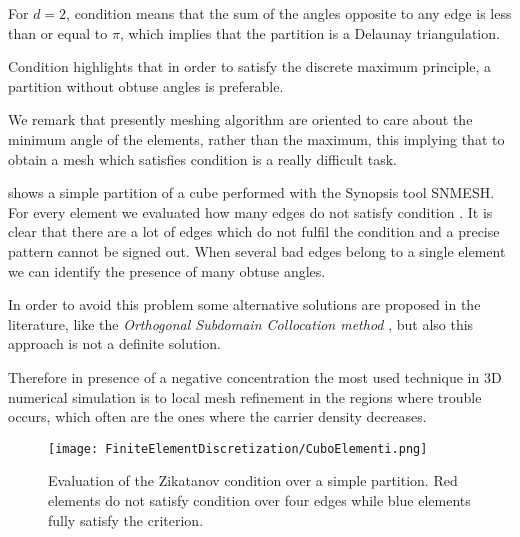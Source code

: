 \begin{Osservazione}
For $d=2$, condition  means that the sum of the angles opposite to any edge is less than or equal to $\pi$, which implies that the partition is a Delaunay triangulation.
\end{Osservazione}

\begin{Osservazione}
Condition  highlights that in order to satisfy the discrete maximum principle, a partition without obtuse angles is preferable.
\end{Osservazione}

We remark that presently meshing algorithm are oriented to care about the minimum angle of the elements, rather than the maximum, this implying that to obtain a mesh which satisfies condition  is a really difficult task. 

 shows a simple partition of a cube performed with the Synopsis tool SNMESH. For every element we evaluated how many edges do not satisfy condition .
It is clear that there are a lot of edges which do not fulfil the condition and a precise pattern cannot be signed out. When several bad edges belong to a single element we can identify the presence of many obtuse angles.

In order to avoid this problem some alternative solutions are proposed in the literature, like the \textit{Orthogonal Subdomain Collocation method} \cite{OSCputticorded}, but also this approach is not a definite solution. 

Therefore in presence of a negative concentration the most used technique in 3D numerical simulation is to local mesh refinement in the regions where trouble occurs, which often are the ones where the carrier density decreases.



\begin{figure}[!b]
\centering
{\texttt{[image: FiniteElementDiscretization/CuboElementi.png]}}
\caption{Evaluation of the Zikatanov condition over a simple partition. Red elements do not satisfy condition   over four edges while blue elements fully satisfy the criterion.}
\label{fig: cubo zikatanov}
\end{figure}

